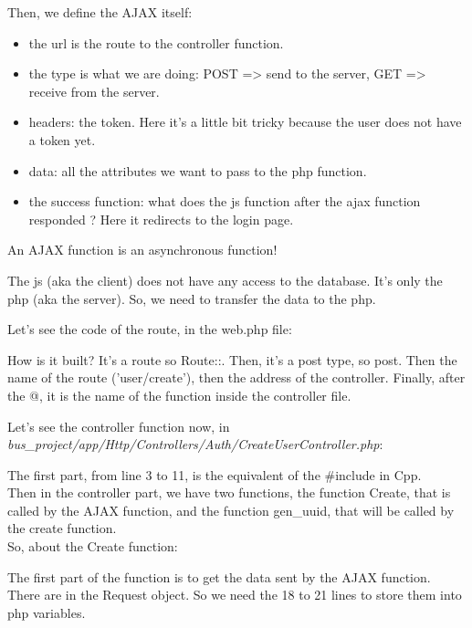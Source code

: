 \documentclass[12pt,a4paper,openany]{book}
\begin{document}
Then, we define the AJAX itself:
\begin{itemize}
	\item the url is the route to the controller function.
	\item the type is what we are doing: POST => send to the server, GET => receive from the server.
	\item headers: the token. Here it's a little bit tricky because the user does not have a token yet.
	\item data: all the attributes we want to pass to the php function.
	\item the success function: what does the js function after the ajax function responded ? Here it redirects to the login page.
\end{itemize}
\begin{remarque}[Warning!]
	An AJAX function is an asynchronous function!
\end{remarque}
\begin{remarque}
	The js (aka the client) does not have any access to the database. It's only the php (aka the server). So, we need to transfer the data to the php.
\end{remarque}
\begin{remarque}
Let's see the code of the route, in the web.php file:

\bigskip
How is it built? It's a route so Route::. Then, it's a post type, so post. Then the name of the route ('user/create'), then the address of the controller. Finally, after the @, it is the name of the function inside the controller file.
\end{remarque}
Let's see the controller function now, in \emph{bus\_project/app/Http/Controllers/Auth/CreateUserController.php}:

\bigskip
The first part, from line 3 to 11, is the equivalent of the \#include in Cpp.\\

Then in the controller part, we have two functions, the function Create, that is called by the AJAX function, and the function gen\_uuid, that will be called by the create function.\\

So, about the Create function:

The first part of the function is to get the data sent by the AJAX function. There are in the Request object. So we need the 18 to 21 lines to store them into php variables.
\end{document}
